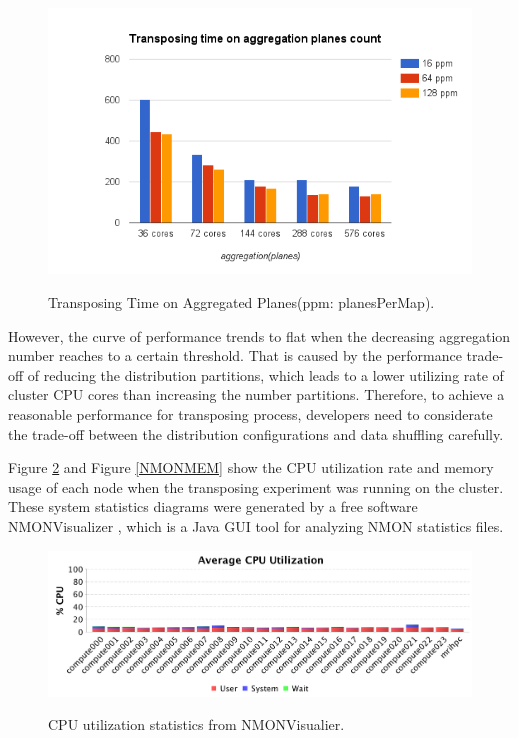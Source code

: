\begin{figure}[h]
\centering
\includegraphics[scale=0.7]{figures/PerfTestAgg.png}\\
\caption{Transposing Time on Aggregated Planes(ppm: planesPerMap).}\label{PerfTestAgg}
\end{figure}

However, the curve of performance trends to flat when the decreasing aggregation number reaches to a certain threshold. That is caused by the performance trade-off of reducing the distribution partitions, which leads to a lower utilizing rate of cluster CPU cores than increasing the number partitions. Therefore, to achieve a reasonable performance for transposing process, developers need to considerate the trade-off between the distribution configurations and data shuffling carefully. 

Figure \ref{NMONCPU} and Figure \ref{NMONMEM} show the CPU utilization rate and memory usage of each node when the transposing experiment was running on the cluster. These system statistics diagrams were generated by a free software NMONVisualizer \cite{NMONVisualizer}, which is a Java GUI tool for analyzing NMON statistics files.

\begin{figure}[h]
\centering
\includegraphics[scale=0.6]{figures/NMONCpu.png}\\
\caption{CPU utilization statistics from NMONVisualier.}\label{NMONCPU}
\end{figure}

